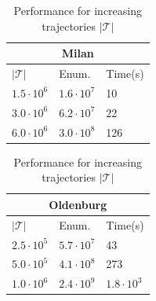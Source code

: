 \documentclass[
]{ceurart}
\renewcommand{\sf}[1]{\textsf{\textup{#1}}}
\begin{document}
\begin{table}[t]
\scriptsize\centering
\centering
\caption{Performance for increasing trajectories $|\mathcal{T}|$}
\label{tab:efftraj}%
\begin{tabular}{p{0.9cm}p{0.9cm}p{1.0cm}}
\multicolumn{3}{c}{\sf{Milan}}\\
\toprule
  $|\mathcal{T}|$ &        Enum. & Time(s) \\
\midrule
 $1.5\cdot10^{6}$ &  $1.6\cdot10^{7}$ &       10 \\
 $3.0\cdot10^{6}$ &  $6.2\cdot10^{7}$ &       22 \\
 $6.0\cdot10^{6}$ &  $3.0\cdot10^{8}$ &      126 \\
\bottomrule
\end{tabular}
\begin{tabular}{p{0.9cm}p{0.9cm}p{1.0cm}}
\multicolumn{3}{c}{\sf{Oldenburg}}\\
\toprule
  $|\mathcal{T}|$ &        Enum. &          Time(s) \\
\midrule
 $2.5\cdot10^{5}$ &  $5.7\cdot10^{7}$ &                43 \\
 $5.0\cdot10^{5}$ &  $4.1\cdot10^{8}$ &               273 \\
 $1.0\cdot10^{6}$ &  $2.4\cdot10^{9}$ &  $1.8\cdot10^{3}$ \\
\bottomrule
\end{tabular}
\end{table}%
\end{document}
